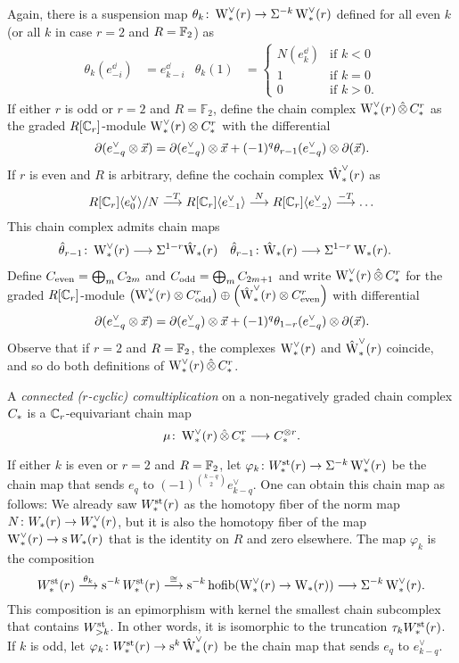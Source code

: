 Again, there is a suspension map $\theta_k \colon  \rWd(r)\to \susp{-k}\rWd(r)$ defined for all even $k$ (or all $k$ in case $r=2$ and $R=\bF_2$) as
\begin{align*}
	\theta_k(e_{-i}^\dd) &= e_{k-i}^\dd
	&
	\theta_k(1) &= \begin{cases} N(e_k^\dd) &\text{if $k<0$} \\ 1 &\text{if $k=0$} \\ 0 &\text{if $k>0$.} \end{cases}
\end{align*}
If either $r$ is odd or $r=2$ and $R=\mathbb{F}_2$, define the chain complex $\rWd(r)\hotimes \rucadenas$ as the graded $R[\Cyc_r]$-module $\rWd(r) \ot  \rucadenas$ with the differential
\[
\partial(e^\dd_{-q} \ot  \vec{x}) = \partial (e^\dd_{-q}) \ot  \vec{x} + (-1)^q \theta_{r-1}(e^\dd_{-q}) \ot  \partial (\vec{x}).
\]
If $r$ is even and $R$ is arbitrary, define the cochain complex $\rWhatd(r)$ as
\[
R[\Cyc_r]\langle e_{0}^\dd\rangle / N \overset{-T}{\lra} R[\Cyc_r]\langle e_{-1}^\dd\rangle \overset{N}{\lra} R[\Cyc_r]\langle e_{-2}^\dd\rangle \overset{-T}{\lra}\ldots
\]
This chain complex admits chain maps
\begin{align*}
    \hat{\theta}_{r-1} \colon  \rWd(r)&\lra \susp{1-r}\rWhat(r)
    &
    \hat{\theta}_{r-1} \colon  \rWhat(r)&\lra \susp{1-r}\rW(r).
\end{align*}
Define $\ucadenas[\mathrm{even}] = \bigoplus_{m}\ucadenas[2m]$ and $\ucadenas[\mathrm{odd}] = \bigoplus_{m}\ucadenas[2m+1]$ and write $\rWd(r)\hotimes \rucadenas$ for the graded $R[\Cyc_r]$-module $\left(\rWd(r) \ot  \rucadenas[\mathrm{odd}]\right)\oplus \left(\rWhatd(r) \ot  \rucadenas[\mathrm{even}]\right)$ with differential
\[
\partial(e^\vee_{-q} \ot  \vec{x}) = \partial (e^\vee_{-q}) \ot  \vec{x} + (-1)^q \theta_{1-r}(e^\vee_{-q}) \ot  \partial (\vec{x}).
\]
Observe that if $r=2$ and $R=\bF_2$, the complexes $\rWd(r)$ and $\rWhatd(r)$ coincide, and so do both definitions of $\rWd(r)\hotimes \rucadenas$.
\begin{definition}
	A \emph{connected ($r$-cyclic) comultiplication} on a non-negatively graded chain complex $\ucadenas$ is a $\Cyc_r$-equivariant chain map
	\[
	\mu \colon  \rWd(r)\hotimes \rucadenas\lra \ucadenas^{ \ot  r}.
	\]
\end{definition}

If either $k$ is even or $r=2$ and $R=\bF_2$, let $\varphi_k \colon  \Wst(r)\to \susp{-k}\rWd(r)$ be the chain map that sends $e_q$ to $(-1)^{\binom{k-q}{2}}e_{k-q}^{\vee}$. One can obtain this chain map as follows: We already saw $\Wst(r)$ as the homotopy fiber of the norm map $N \colon  \W(r)\to \Wd(r)$, but it is also the homotopy fiber of the map $\rWd(r)\to \sus{}\W(r)$ that is the identity on $R$ and zero elsewhere. The map $\varphi_k$ is the composition
\[
	\Wst(r)\overset{\theta_k}{\lra} \sus{-k} \Wst(r) \overset{\cong}{\lra} \sus{-k}\hofib(\rWd(r)\to \rW(r)) \lra \susp{-k}\rWd(r).
\]
This composition is an epimorphism with kernel the smallest chain subcomplex that contains $\Wst[>k]$. In other words, it is isomorphic to the truncation $\tau_k \Wst(r)$. If $k$ is odd, let $\varphi_k \colon  \Wst(r)\to \sus{k}\rWhatd(r)$ be the chain map that sends $e_q$ to $e_{k-q}^{\vee}$.

